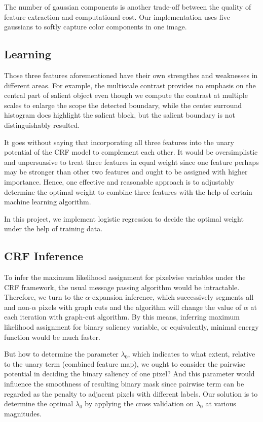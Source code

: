 \documentclass[10pt,twocolumn,letterpaper]{article}
\begin{document}
The number of gaussian components is another trade-off between the quality of 
feature extraction and computational cost. Our implementation uses five gaussians 
to softly capture color components in one image. 


\subsection{Learning}
Those three features aforementioned have their own strengthes and weaknesses in different areas. 
For example, the multiscale contrast provides no emphasis on the central part of salient object even though 
we compute the contrast at multiple scales to enlarge the scope the detected boundary, while 
the center surround histogram does highlight the salient block, but the salient boundary is not distinguishably 
resulted. 

It goes without saying that incorporating all three features into the unary potential of the CRF model to complement each other. It would be oversimplistic and unpersuasive to treat three features in equal weight since one feature perhaps may be stronger than other two features and ought to be assigned with higher importance. Hence, one effective and reasonable approach is to adjustably determine the optimal weight to combine three features with the help of certain machine learning algorithm. 

In this project, we implement logistic regression to decide the optimal weight under the help of training data.

\subsection{CRF Inference}
To infer the maximum likelihood assignment for pixelwise variables under the CRF framework, the usual message passing algorithm would be intractable. Therefore, we turn to the $\alpha$-expansion inference,
which successively segments all and non-$\alpha$ pixels with graph cuts and the algorithm will change the value of $\alpha$ at each iteration with graph-cut algorithm. By this means, inferring maximum likelihood assignment for binary saliency variable, or equivalently, 
 minimal energy function would be much faster. 

But how to determine the parameter $\lambda_0$, which indicates to what extent, relative to the unary term (combined feature map), we ought to consider the pairwise potential in deciding the binary saliency of one pixel? And this parameter would influence the smoothness of resulting binary mask since pairwise term can be regarded as the penalty to adjacent pixels with different labels. Our solution is to determine the optimal $\lambda_0$ by applying the cross validation on $\lambda_0$ at various magnitudes. 
\end{document}
